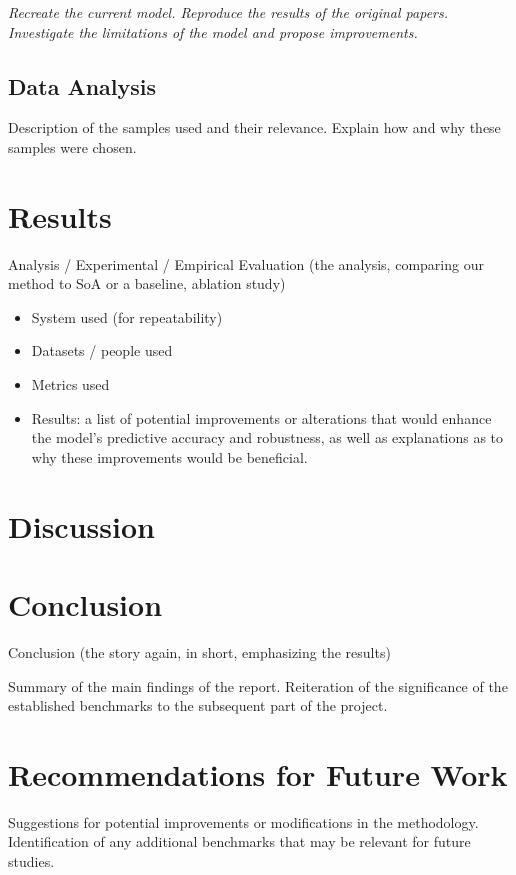 \textit{Recreate the current model. Reproduce the results of the original papers. Investigate the limitations of the model and propose improvements.}

\subsection{Data Analysis}
Description of the samples used and their relevance.
Explain how and why these samples were chosen.

\section{Results}
Analysis / Experimental / Empirical Evaluation (the analysis, comparing our method to SoA or a baseline, ablation study)
\begin{itemize}
    \item System used (for repeatability)
    \item Datasets / people used
    \item Metrics used
    \item Results: a list of potential improvements or alterations that would enhance the model's predictive accuracy and robustness, as well as explanations as to why these improvements would be beneficial.
\end{itemize}

\section{Discussion}

\section{Conclusion}
Conclusion (the story again, in short, emphasizing the results)

Summary of the main findings of the report.
Reiteration of the significance of the established benchmarks to the subsequent part of the project.

\section{Recommendations for Future Work}
Suggestions for potential improvements or modifications in the methodology.
Identification of any additional benchmarks that may be relevant for future studies.
